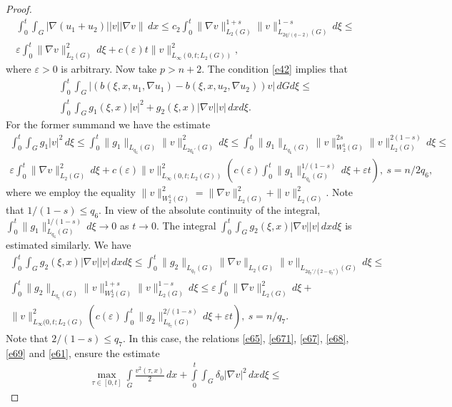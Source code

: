 \documentclass{article}
\theoremstyle{plain}
\begin{document}
\begin{proof}
\begin{multline}
 \int_0^t\int_G|\nabla (u_{1}+u_{2})| |v||\nabla v\|\, dx \leq c_2\int_0^{t}\| \nabla v\|_{L_2(G)}^{1+s}\| v\|_{L_{2q/(q-2)}(G)}^{1-s}\,d\xi\leq \\
 \varepsilon \int_0^t \|\nabla v\|_{L_2(G)}^2\,d\xi + c(\varepsilon) t  \|v\|_{L_{\infty}(0,t;L_2(G))}^{2}, 
  \end{multline} 
 where  $ \varepsilon>0$ is arbitrary. 
 Now take $p>n+2$. 
 The condition  \eqref{e42} implies that 
  \begin{multline}\label{e67}
 \int_0^t\int_G|(b(\xi,x,u_1,\nabla u_1)-b(\xi,x,u_2,\nabla u_2))v|\,dGd\xi\leq \\ \int_0^t\int_G g_1(\xi,x)|v|^2 + g_2(\xi,x) |\nabla v| |v| \,dxd\xi.
 \end{multline} 
  For  the former summand we have the estimate 
\begin{multline}\label{e68}
 \int_0^t\int_G g_1 |v|^2\,d\xi\leq \int_0^t \|g_1\|_{L_{q_6}(G)}  \|v\|_{L_{2q_6'}(G)}^2\,d\xi \leq 
 \int_0^t \|g_1\|_{L_{q_6}(G)}  \|v\|_{W_{2}^1(G)}^{2s}\|v\|_{L_{2}(G)}^{2(1-s)}\,d\xi \leq \\
 \varepsilon \int_0^t \|\nabla v\|_{L_{2}(G)}^{2}\,d\xi + c(\varepsilon)\|v\|_{L_{\infty}(0,t;L_2(G))}^{2}(c(\varepsilon)\int_0^t \|g_1\|_{L_{q_6}(G)}^{1/(1-s)}\,d\xi+\varepsilon t),\ s=n/2q_6,
 \end{multline}
  where we employ the equality  $\|v\|_{W_2^1(G)}^2=\|\nabla v\|_{L_2(G)}^2+\| v\|_{L_2(G)}^2$. 
 Note that  $1/(1-s)\leq q_6$. In view of the absolute continuity of the integral,  $\int_0^t \|g_1\|_{L_{q_6}(G)}^{1/(1-s)}\,d\xi\to 0$ as $t\to 0$. 
 The  integral  $\int_0^t\int_G g_2(\xi,x) |\nabla v| |v| \,dxd\xi$ is estimated similarly. We have
\begin{multline}\label{e69}
\int_0^t\int_G g_2(\xi,x) |\nabla v| |v| \,dxd\xi\leq  
 \int_0^t \|g_2\|_{L_{q_7}(G)}  \|\nabla v\|_{L_{2}(G)}\| v\|_{L_{2q_7'/(2-q_7')}(G)}\,d\xi \leq \\
 \int_0^t  \|g_2\|_{L_{q_7}(G)}  \|v\|_{W_{2}^1(G)}^{1+s}\|v\|_{L_{2}(G)}^{1-s}\,d\xi \leq 
 \varepsilon \int_0^t \|\nabla v\|_{L_{2}(G)}^{2}\,d\xi+ \\ \|v\|_{L_{\infty}(0,t;L_2(G)}^{2}(c(\varepsilon)\int_0^t \|g_2\|_{L_{q_7}(G)}^{2/(1-s)}\,d\xi+\varepsilon t),\ s=n/q_7.
 \end{multline}
Note that  $2/(1-s)\leq q_7$. In this case, the relations   \eqref{e65}, \eqref{e671}, \eqref{e67}, \eqref{e68}, \eqref{e69} and \eqref{e61}, ensure the estimate 
\begin{multline}\label{e70}
 \max_{\tau\in [0,t]}\int\limits_G \frac{v^2(\tau,x)}{2} \,dx+ \int\limits_0^t\int_G\delta_0|\nabla v|^2\,dxd\xi\leq

\end{multline}
\end{proof}
\end{document}
